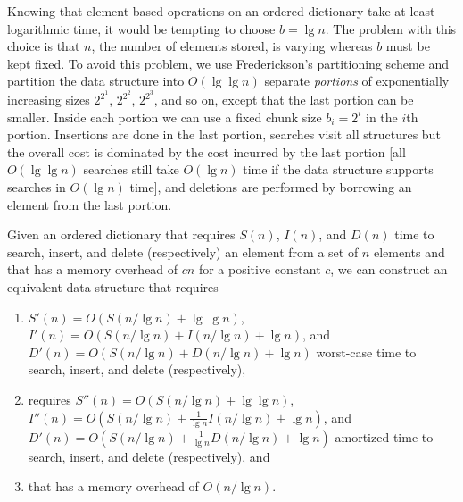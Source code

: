 \documentclass{DIKU-article}
\newcommand{\comment}[1]{}
\begin{document}
Knowing that element-based operations on an ordered dictionary take at
least logarithmic time, it would be tempting to choose $b = \lg n$.
The problem with this choice is that $n$, the number of elements
stored, is varying whereas $b$ must be kept fixed. To avoid this
problem, we use Frederickson's partitioning scheme \cite{Fre83} and
partition the data structure into $O(\lg\lg n)$ separate
\emph{portions} of exponentially increasing sizes $2^{2^{1}}$,
$2^{2^{2}}$, $2^{2^{3}}$, and so on, except that the last portion can
be smaller.  Inside each portion we can use a fixed chunk size
$b_i=2^i$ in the $i$th portion. Insertions are done in the last
portion, searches visit all structures but the overall cost is
dominated by the cost incurred by the last portion [all $O(\lg\lg n)$
searches still take $O(\lg n)$ time if the data structure supports
searches in $O(\lg n)$ time], and deletions are performed by borrowing
an element from the last portion. 

\begin{theorem}
\label{theorem:elementary-c}
Given an ordered dictionary that requires $S(n)$, $I(n)$, and $D(n)$
time to search, insert, and delete (respectively) an element from a
set of $n$ elements and that has a memory overhead of $cn$ for a
positive constant $c$, we can construct an equivalent data structure
that requires 
\begin{enumerate}
\item $S'(n)=O(S(n/\lg n)+\lg\lg n)$, $I'(n)=O(S(n/\lg n)+I(n/\lg n)+\lg n)$,
and $D'(n)=O(S(n/\lg n)+D(n/\lg n)+\lg n)$ worst-case time to search, insert,
and delete (respectively), 
\item requires $S''(n)=O(S(n/\lg n)+\lg\lg n)$,
$I''(n)=O(S(n/\lg n)+\frac{1}{\lg n}I(n/\lg n)+\lg n)$, and
$D'(n)=O(S(n/\lg n)+\frac{1}{\lg n}D(n/\lg n)+\lg n)$ amortized time to search,
insert, and delete (respectively), and 
\item that has a memory overhead of
$O(n/\lg n)$.
\end{enumerate}
\end{theorem}

\comment{
\begin{theorem}
\label{theorem:advanced}
Given an ordered dictionary that requires
$S(n)$, $I(n)$, and $D(n)$ time to search, insert, and delete
(respectively) an element from a set of $n$ elements and that has a memory
overhead of $cn$ for a positive constant $c$, we can construct an equivalent
data structure that requires $S'(n) = O(S(n/\lg n)+\lg\lg n)$,
$I'(n)=O(I(n/\lg n)+\lg n)$, and $D'(n)=O(D(n/\lg n)+\lg n)$ time to
search, insert, and delete (respectively) and that requires at most $n
+ O(\sqrt{n})$ locations for elements and 
$O(n/\lg n)$ words for pointers, counters, and flags.
\end{theorem}
}
\end{document}
